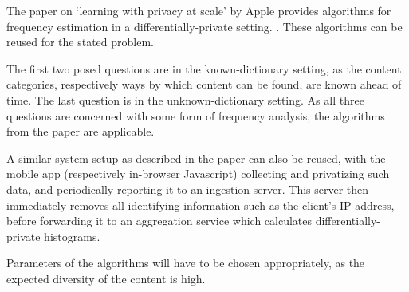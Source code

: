 \documentclass[a4paper]{scrreprt}
\begin{document}
The paper on `learning with privacy at scale' by Apple provides algorithms for
frequency estimation in a differentially-private setting.
\autocite{differentialprivacyteamappleLearningPrivacyScale}. These algorithms
can be reused for the stated problem.

The first two posed questions are in the known-dictionary setting, as the
content categories, respectively ways by which content can be found, are known
ahead of time. The last question is in the unknown-dictionary setting. As all
three questions are concerned with some form of frequency analysis, the
algorithms from the paper are applicable.

A similar system setup as described in the paper can also be reused, with the
mobile app (respectively in-browser Javascript) collecting and privatizing such
data, and periodically reporting it to an ingestion server. This server then
immediately removes all identifying information such as the client's IP
address, before forwarding it to an aggregation service which calculates
differentially-private histograms.

Parameters of the algorithms will have to be chosen appropriately, as the
expected diversity of the content is high.

\printbibliography
\end{document}
